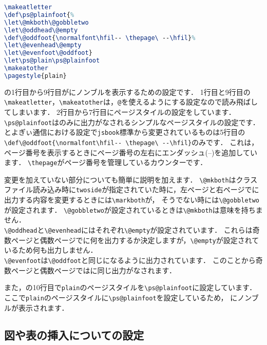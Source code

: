 \begin{lstlisting}[caption = ノンブルと柱のレイアウト, label = list:footer, language=tex]
\makeatletter
\def\ps@plainfoot{%
\let\@mkboth\@gobbletwo
\let\@oddhead\@empty
\def\@oddfoot{\normalfont\hfil-- \thepage\ --\hfil}%
\let\@evenhead\@empty
\let\@evenfoot\@oddfoot}
\let\ps@plain\ps@plainfoot
\makeatother
\pagestyle{plain}
\end{lstlisting}

の1行目から9行目がにノンブルを表示するための設定です．
1行目と9行目の\verb|\makeatletter|，\verb|\makeatother|は，\texttt{@}を使えるようにする設定なので読み飛ばしてしまいます．
2行目から7行目にページスタイルの設定をしています．
\verb|\ps@plainfoot|はのみに出力がなされるシンプルなページスタイルの設定です．
とよぎぃ通信における設定で\verb|jsbook|標準から変更されているものは5行目の\verb|\def\@oddfoot{\normalfont\hfil-- \thepage\ --\hfil}|のみです．
これは，ページ番号を表示するときにページ番号の左右にエンダッシュ(--)を追加しています．
\verb|\thepage|がページ番号を管理しているカウンターです．

変更を加えていない部分についても簡単に説明を加えます．
\verb|\@mkboth|はクラスファイル読み込み時に\texttt{twoside}が指定されていた時に，左ページと右ページでに出力する内容を変更するときには\verb|\markboth|が，
そうでない時には\verb|\@gobbletwo|が設定されます．
\verb|\@gobbletwo|が設定されているときは\verb|\@mkboth|は意味を持ちません．\\
\verb|\@oddhead|と\verb|\@evenhead|にはそれぞれ\verb|\@empty|が設定されています．
これらは奇数ページと偶数ページでに何を出力するか決定しますが，\verb|\@empty|が設定されているため何も出力しません．\\
\verb|\@evenfoot|は\verb|\@oddfoot|と同じになるように出力されています．
このことから奇数ページと偶数ページではに同じ出力がなされます．

また，の10行目で\verb|plain|のページスタイルを\verb|\ps@plainfoot|に設定しています．
ここで\verb|plain|のページスタイルに\verb|\ps@plainfoot|を設定しているため，
にノンブルが表示されます．

\subsection{図や表の挿入についての設定}

